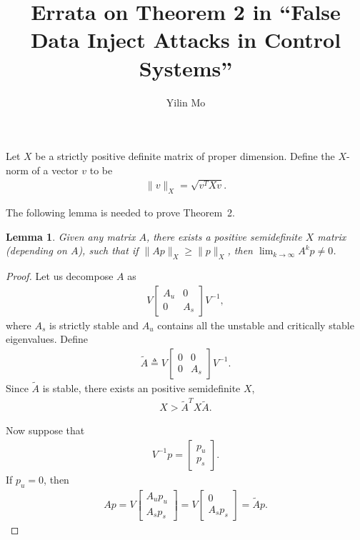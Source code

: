 \documentclass{article}
\title{Errata on Theorem 2 in ``False Data Inject Attacks in Control Systems''}
\author{Yilin Mo}
\newtheorem{lemma}{Lemma}
\begin{document}
 \maketitle
Let $X$ be a strictly positive definite matrix of proper dimension. Define the $X$-norm of a vector $v$ to be
\begin{align*}
  \|v\|_X = \sqrt{v^TXv}.
\end{align*}

The following lemma is needed to prove Theorem~2.
\begin{lemma}
Given any matrix $A$, there exists a positive semidefinite $X$ matrix (depending on $A$), such that if $\|Ap\|_X \geq \|p\|_X$, then $\lim_{k\rightarrow \infty}A^k p \neq 0$.
\end{lemma}
\begin{proof}
  Let us decompose $A$ as
  \begin{align*}
    V \begin{bmatrix}
      A_u&0\\
      0&A_s
    \end{bmatrix}V^{-1},
  \end{align*}
 where $A_s$ is strictly stable and $A_u$ contains all the unstable and critically stable eigenvalues. Define
  \begin{align*}
    \tilde A \triangleq  V \begin{bmatrix}
      0&0\\
      0&A_s
    \end{bmatrix}V^{-1}.
  \end{align*}
Since $\tilde A$ is stable, there exists an positive semidefinite $X$, 
\begin{align*}
  X > \tilde A^T X\tilde A.
\end{align*}

Now suppose that 
\begin{align*}
  V^{-1}p = \begin{bmatrix}
    p_u\\
    p_s
  \end{bmatrix}.
\end{align*}
If $p_u = 0$, then
\begin{align*}
  Ap = V \begin{bmatrix}
    A_up_u\\
    A_sp_s
  \end{bmatrix} = V \begin{bmatrix}
    0\\
    A_sp_s
  \end{bmatrix}  = \tilde A p.
\end{align*}


\end{proof}
\end{document}
